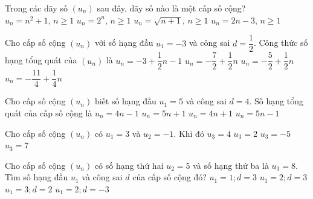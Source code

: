 \begin{ex}%
	Trong các dãy số $(u_n)$ sau đây, dãy số nào là một cấp số cộng? 
	 \choice
		 {$u_n=n^2+1,\, n \ge 1$}
		 {$u_n=2^n,\, n \ge 1$}
		{$u_n=\sqrt{n+1},\, n \ge 1$} 
		 {\True $u_n=2n-3,\, n \ge 1$}
\end{ex}

\begin{ex}%
	Cho cấp số  cộng $(u_n)$ với số hạng đầu $u_1=-3$ và công sai $d=\dfrac{1}{2}$. Công thức số hạng tổng quát của $(u_n)$ là
	 \choice
		{$u_n=-3+\dfrac{1}{2}n-1$} 
		 {\True $u_n=-\dfrac{7}{2}+\dfrac{1}{2}n$}
		{$u_n=-\dfrac{5}{2}+\dfrac{1}{2}n$} 
		{$u_n=-\dfrac{11}{4}+\dfrac{1}{4}n$} 
\end{ex}

\begin{ex}%
	Cho cấp số cộng  $(u_n)$ biết số hạng đầu $u_1=5$ và công sai $d=4$. Số hạng tổng quát của cấp số cộng là
	 \choice
		{ $u_n=4n-1$} 
		{ $u_n=5n+1$} 
		{\True $u_n=4n+1$} 
		{ $u_n=5n-1$} 
\end{ex}

\begin{ex}%
	Cho cấp  số cộng $(u_n)$ có $u_1=3$ và $u_2=-1$.
	Khi  đó
	 \choice
		 {$u_3=4$}
		{$u_3=2$} 
		 {\True $u_3=-5$}
		 {$u_3=7$}
\end{ex}

\begin{ex}%
	Cho cấp số cộng $(u_n)$  có số hạng thứ hai $u_2=5$ và số hạng thứ ba là $u_3=8$. Tìm số hạng đầu $u_1$ và công sai $d$ của cấp số cộng đó?
	\choice 
		{$u_1=1;d=3$} 
		 {\True $u_1=2;d=3$}
		 {$u_1=3;d=2$}
		{$u_1=2;d=-3$} 
\end{ex}

